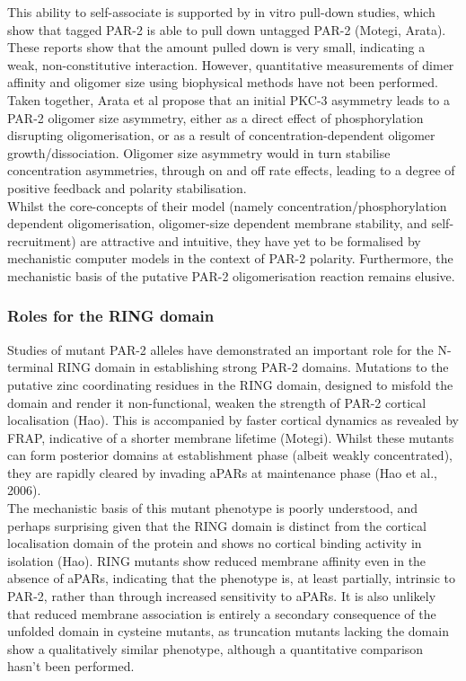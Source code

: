 \documentclass[12pt]{"article"}
\begin{document}
This ability to self-associate is supported by in vitro pull-down studies, which show that tagged PAR-2 is able to pull down untagged PAR-2 (Motegi, Arata). These reports show that the amount pulled down is very small, indicating a weak, non-constitutive interaction. However, quantitative measurements of dimer affinity and oligomer size using biophysical methods have not been performed.\\

Taken together, Arata et al propose that an initial PKC-3 asymmetry leads to a PAR-2 oligomer size asymmetry, either as a direct effect of phosphorylation disrupting oligomerisation, or as a result of concentration-dependent oligomer growth/dissociation. Oligomer size asymmetry would in turn stabilise concentration asymmetries, through on and off rate effects, leading to a degree of positive feedback and polarity stabilisation.\\

Whilst the core-concepts of their model (namely concentration/phosphorylation dependent oligomerisation, oligomer-size dependent membrane stability, and self-recruitment) are attractive and intuitive, they have yet to be formalised by mechanistic computer models in the context of PAR-2 polarity. Furthermore, the mechanistic basis of the putative PAR-2 oligomerisation reaction remains elusive.\\


\subsubsection{Roles for the RING domain}

Studies of mutant PAR-2 alleles have demonstrated an important role for the N-terminal RING domain in establishing strong PAR-2 domains. Mutations to the putative zinc coordinating residues in the RING domain, designed to misfold the domain and render it non-functional, weaken the strength of PAR-2 cortical localisation (Hao). This is accompanied by faster cortical dynamics as revealed by FRAP, indicative of a shorter membrane lifetime (Motegi). Whilst these mutants can form posterior domains at establishment phase (albeit weakly concentrated), they are rapidly cleared by invading aPARs at maintenance phase (Hao et al., 2006).\\

The mechanistic basis of this mutant phenotype is poorly understood, and perhaps surprising given that the RING domain is distinct from the cortical localisation domain of the protein and shows no cortical binding activity in isolation (Hao). RING mutants show reduced membrane affinity even in the absence of aPARs, indicating that the phenotype is, at least partially, intrinsic to PAR-2, rather than through increased sensitivity to aPARs. It is also unlikely that reduced membrane association is entirely a secondary consequence of the unfolded domain in cysteine mutants, as truncation mutants lacking the domain show a qualitatively similar phenotype, although a quantitative comparison hasn’t been performed.\\
\end{document}
